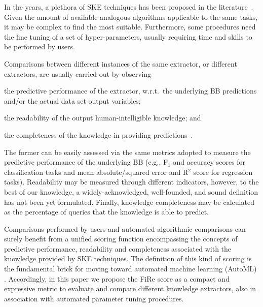 \documentclass{article}
\newcommand{\fire}{FiRe}
\newenvironment{inlinelist}{\begin{enumerate*}[label=\emph{(\roman{*})}]}{\end{enumerate*}}
\begin{document}
In the years, a plethora of SKE techniques has been proposed in the literature~\cite[for instance]{breiman1984classification,craven1994using,Thrun94,Andrews95rulex,craven1996extracting,BenitezCR97,SetionoL97,schmitz1999ann,SetionoL00,CastilloGP01,saito2002extracting,setiono2002extraction,Markowska-KaczmarT03,SetionoT04,barakat2005eclectic,huysmans2006iter,grex-icdm2008,NunezAC08,gridex-extraamas2021,gridrex-kr2022}.%
%
Given the amount of available analogous algorithms applicable to the same tasks, it may be complex to find the most suitable.
%
Furthermore, some procedures need the fine tuning of a set of hyper-parameters, usually requiring time and skills to be performed by users.

Comparisons between different instances of the same extractor, or different extractors, are usually carried out by observing
%
\begin{inlinelist}
	\item the predictive performance of the extractor, w.r.t.\ the underlying BB predictions and/or the actual data set output variables;
	\item the readability of the output human-intelligible knowledge; and
	\item the completeness of the knowledge in providing predictions~\cite{garcez2001symbolic,tran2013knowledge,skemetrics-aaai2023}.
\end{inlinelist}

The former can be easily assessed via the same metrics adopted to measure the predictive performance of the underlying BB (e.g., F$_1$ and accuracy scores for classification tasks and mean absolute/squared error and R$^2$ score for regression tasks).
%
Readability may be measured through different indicators, however, to the best of our knowledge, a widely-acknowledged, well-founded, and sound definition has not been yet formulated.
%
Finally, knowledge completeness may be calculated as the percentage of queries that the knowledge is able to predict.

Comparisons performed by users and automated algorithmic comparisons can surely benefit from a unified scoring function encompassing the concepts of predictive performance, readability and completeness associated with the knowledge provided by SKE techniques.
%
The definition of this kind of scoring is the fundamental brick for moving toward automated machine learning (AutoML) \cite{karmaker2021automl}.
%
Accordingly, in this paper we propose the \fire{} score as a compact and expressive metric to evaluate and compare different knowledge extractors, also in association with automated parameter tuning procedures.
\end{document}
